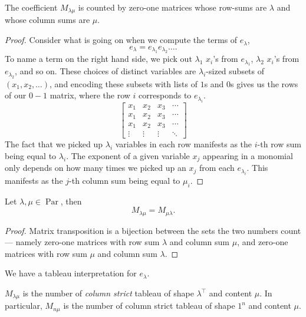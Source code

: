 \documentclass{article}
\DeclareMathOperator{\Par}{Par}
\begin{document}
\begin{theorem} \label{thm:e2mCombInterpretation}
    The coefficient $M_{\lambda\mu}$ is counted by zero-one matrices whose row-sums are $\lambda$ and whose column sums are $\mu$.
\end{theorem}

\begin{proof}
    Consider what is going on when we compute the terms of $e_\lambda$,
    \[
        e_\lambda = e_{\lambda_1}e_{\lambda_2}\ldots.
    \]
    To name a term on the right hand side, we pick out $\lambda_1$ $x_i$'s from $e_{\lambda_1}$, $\lambda_2$ $x_i$'s from $e_{\lambda_2}$, and so on.
    These choices of distinct variables are $\lambda_i$-sized subsets of $(x_1, x_2, \ldots)$, and encoding these subsets with lists of $1$s and $0$s gives us the rows of our $0-1$ matrix, where the row $i$ corresponds to $e_{\lambda_i}$.     
    \[
        \begin{bmatrix}
            x_1 & x_2 & x_3 & \cdots \\
            x_1 & x_2 & x_3 & \cdots \\
            x_1 & x_2 & x_3 & \cdots \\
            \vdots & \vdots & \vdots & \ddots 
        \end{bmatrix}
    \]
    The fact that we picked up $\lambda_i$ variables in each row manifests as the $i$-th row sum being equal to $\lambda_i$.
The exponent of a given variable $x_j$ appearing in a monomial only depends on how many times we picked up an $x_j$ from each $e_{\lambda_i}$. 
This manifests as the $j$-th column sum being equal to $\mu_i$.
\end{proof}


\begin{theorem} \label{thm:e2msymmetric}
    Let $\lambda,\mu \in \Par$, then
    \[
        M_{\lambda\mu} = M_{\mu\lambda}.
    \]
\end{theorem}

\begin{proof}
    Matrix transposition is a bijection between the sets the two numbers count--- namely zero-one matrices with row sum $\lambda$ and column sum $\mu$, and zero-one matrices with row sum $\mu$ and column sum $\lambda$.
\end{proof}

We have a tableau interpretation for $e_\lambda$.

\begin{proposition}
    \label{prop:eTableauInterpretation}
    $M_{\lambda\mu}$ is the number of \textit{column strict} tableau of shape $\lambda^\top$ and content $\mu$.
    In particular, $M_{n\mu}$ is the number of column strict tableau of shape $1^n$ and content $\mu$.
\end{proposition}
\end{document}
